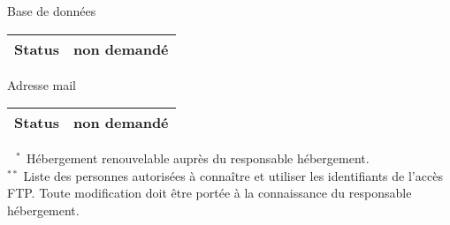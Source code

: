 \documentclass{../ki019}
\newenvironment{tableau}[1]{
\LARGE #1\\
\vspace{0.4cm}
\begin{tabular}{|K{5cm}|K{10cm}|}
}
{
\end{tabular}
\vspace{0.5cm}
}
\begin{document}
\begin{center}
\begin{tableau}{Base de données}
\hline
Status & non demandé \\
\hline
\end{tableau}

\begin{tableau}{Adresse mail}
\hline
Status & non demandé \\
\hline
\end{tableau}

\end{center}

\Large \noindent
$^{\phantom{*}*}$ Hébergement renouvelable auprès du responsable hébergement. \\
$^{**}$ Liste des personnes autorisées à connaître et utiliser les identifiants de l'accès FTP. Toute modification doit être portée à la connaissance du responsable hébergement.

\Footer
\end{document}
